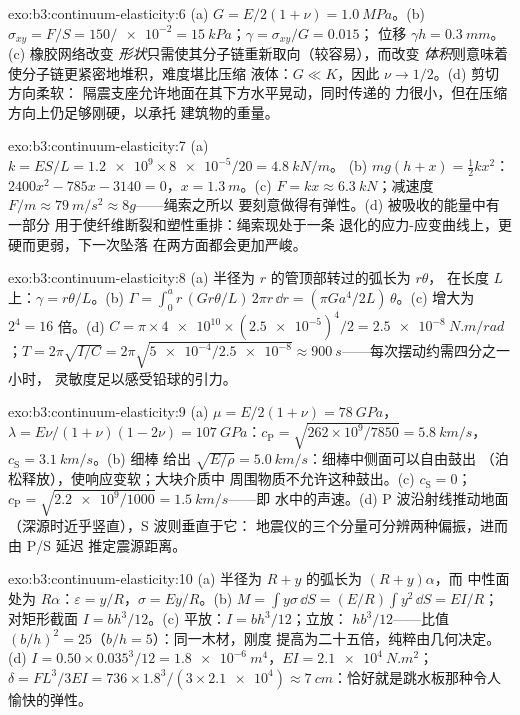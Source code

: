 \begin{solution}{exo:b3:continuum-elasticity:6}
(a) $G = E/2(1 + \nu) = \qty{1.0}{MPa}$。(b) $\sigma_{xy} = F/S =
150/\num{e-2} = \qty{15}{kPa}$；$\gamma = \sigma_{xy}/G = 0.015$；
位移 $\gamma h = \qty{0.3}{mm}$。(c) 橡胶网络改变
\emph{形状}只需使其分子链重新取向（较容易），而改变
\emph{体积}则意味着使分子链更紧密地堆积，难度堪比压缩
液体：$G \ll K$，因此 $\nu \to 1/2$。(d) 剪切方向柔软：
隔震支座允许地面在其下方水平晃动，同时传递的
力很小，但在压缩方向上仍足够刚硬，以承托
建筑物的重量。
\end{solution}

\begin{solution}{exo:b3:continuum-elasticity:7}
(a) $k = ES/L = \num{1.2e9} \times \num{8e-5}/20 = \qty{4.8}{kN/m}$。
(b) $mg(h + x) = \tfrac12 kx^2$：$2400x^2 - 785x - 3140 = 0$，$x =
\qty{1.3}{m}$。(c) $F = kx \approx \qty{6.3}{kN}$；减速度 $F/m
\approx \qty{79}{m/s^2} \approx 8g$——绳索之所以
要刻意做得有弹性。(d) 被吸收的能量中有一部分
用于使纤维断裂和塑性重排：绳索现处于一条
退化的应力-应变曲线上，更硬而更弱，下一次坠落
在两方面都会更加严峻。
\end{solution}

\begin{solution}{exo:b3:continuum-elasticity:8}
(a) 半径为 $r$ 的管顶部转过的弧长为 $r\theta$，
在长度 $L$ 上：$\gamma = r\theta/L$。(b) $\Gamma = \int_0^a r\,(G r\theta/L)\,
2\pi r\,\dd r = (\pi Ga^4/2L)\,\theta$。(c) 增大为 $2^4 = 16$ 倍。(d) $C =
\pi \times \num{4e10} \times (\num{2.5e-5})^4/2 =
\qty{2.5e-8}{N.m/rad}$；$T = 2\pi\sqrt{I/C} = 2\pi\sqrt{\num{5e-4}/
\num{2.5e-8}} \approx \qty{900}{s}$——每次摆动约需四分之一小时，
灵敏度足以感受铅球的引力。
\end{solution}

\begin{solution}{exo:b3:continuum-elasticity:9}
(a) $\mu = E/2(1+\nu) = \qty{78}{GPa}$，$\lambda = E\nu/(1+\nu)(1-2\nu)
= \qty{107}{GPa}$：$c_{\text{P}} = \sqrt{262\times10^9/7850} =
\qty{5.8}{km/s}$，$c_{\text{S}} = \qty{3.1}{km/s}$。(b) 细棒
给出 $\sqrt{E/\rho} = \qty{5.0}{km/s}$：细棒中侧面可以自由鼓出
（泊松释放），使响应变软；大块介质中
周围物质不允许这种鼓出。(c) $c_{\text{S}} = 0$；
$c_{\text{P}} = \sqrt{\num{2.2e9}/1000} = \qty{1.5}{km/s}$——即
水中的声速。(d) P 波沿射线推动地面
（深源时近乎竖直），S 波则垂直于它：
地震仪的三个分量可分辨两种偏振，进而由 P/S 延迟
推定震源距离。
\end{solution}

\begin{solution}{exo:b3:continuum-elasticity:10}
(a) 半径为 $R + y$ 的弧长为 $(R + y)\alpha$，而
中性面处为 $R\alpha$：$\varepsilon = y/R$，$\sigma =
Ey/R$。(b) $M = \int y\sigma\,\dd S = (E/R)\int y^2\,\dd S = EI/R$；
对矩形截面 $I = bh^3/12$。(c) 平放：$I = bh^3/12$；立放：
$hb^3/12$——比值 $(b/h)^2 = 25$（$b/h = 5$）：同一木材，刚度
提高为二十五倍，纯粹由几何决定。(d) $I = 0.50 \times
0.035^3/12 = \qty{1.8e-6}{m^4}$，$EI = \qty{2.1e4}{N.m^2}$；$\delta =
FL^3/3EI = 736 \times 1.8^3/(3 \times \num{2.1e4}) \approx
\qty{7}{cm}$：恰好就是跳水板那种令人愉快的弹性。
\end{solution}

